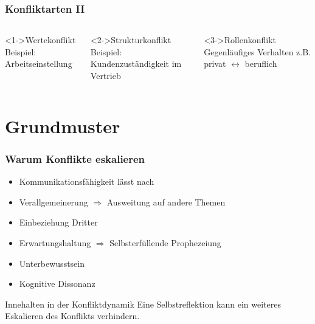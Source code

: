 \documentclass[
	ngerman,
	xcolor=dvipsnames,
	11pt
	]{beamer}
\begin{document}
\begin{frame}
	\frametitle{Konfliktarten II}

	\begin{columns}[c]
		\begin{exampleblock}<1->{Wertekonflikt}
			Beispiel: Arbeitseinstellung
		\end{exampleblock}

		\begin{exampleblock}<2->{Strukturkonflikt}
			Beispiel: Kundenzuständigkeit im Vertrieb
		\end{exampleblock}

		\begin{exampleblock}<3->{Rollenkonflikt}
			Gegenläufiges Verhalten z.B. privat $\leftrightarrow$ beruflich
		\end{exampleblock}
	\end{columns}

\end{frame}

\section{Grundmuster}
\begin{frame}
	\frametitle{Warum Konflikte eskalieren}
	\begin{itemize}
		\item Kommunikationsfähigkeit lässt nach
		\item Verallgemeinerung $\Rightarrow$ Ausweitung auf andere Themen
		\item Einbeziehung Dritter
	\end{itemize}
	\pause
	\begin{itemize}
		\item Erwartungshaltung $\Rightarrow$ Selbsterfüllende Prophezeiung
		\item Unterbewusstsein
		\item Kognitive Dissonanz
	\end{itemize}

	\pause
	\begin{alertblock}{Innehalten in der Konfliktdynamik}
		Eine Selbstreflektion kann ein weiteres Eskalieren des Konflikts verhindern.
	\end{alertblock}
\end{frame}
\end{document}
